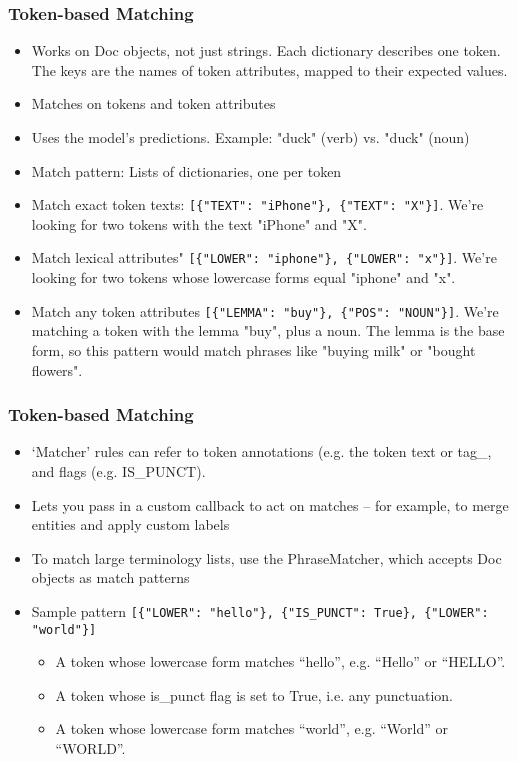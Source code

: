 \begin{frame}[fragile]\frametitle{Token-based Matching }

  \begin{itemize}
	\item Works on Doc objects, not just strings. Each dictionary describes one token. The keys are the names of token attributes, mapped to their expected values.
	\item Matches on tokens and token attributes
	\item Uses the model's predictions. Example: "duck" (verb) vs. "duck" (noun)
	\item Match pattern: Lists of dictionaries, one per token
	\item Match exact token texts: \lstinline|[{"TEXT": "iPhone"}, {"TEXT": "X"}]|. We're looking for two tokens with the text "iPhone" and "X".
	\item Match lexical attributes" \lstinline|[{"LOWER": "iphone"}, {"LOWER": "x"}]|. We're looking for two tokens whose lowercase forms equal "iphone" and "x".
	\item Match any token attributes \lstinline|[{"LEMMA": "buy"}, {"POS": "NOUN"}]|. We're matching a token with the lemma "buy", plus a noun. The lemma is the base form, so this pattern would match phrases like "buying milk" or "bought flowers".

  \end{itemize}
	
\end{frame}

\begin{frame}[fragile]\frametitle{Token-based Matching }

  \begin{itemize}
    \item `Matcher' rules can refer to token annotations (e.g. the token text or tag\_, and flags (e.g. IS\_PUNCT).
		\item Lets you pass in a custom callback to act on matches – for example, to merge entities and apply custom labels
		\item To match large terminology lists, use the PhraseMatcher, which accepts Doc objects as match patterns
		\item Sample pattern \lstinline|[{"LOWER": "hello"}, {"IS_PUNCT": True}, {"LOWER": "world"}]|
  \begin{itemize}
    \item A token whose lowercase form matches “hello”, e.g. “Hello” or “HELLO”.
    \item A token whose is\_punct flag is set to True, i.e. any punctuation.
    \item A token whose lowercase form matches “world”, e.g. “World” or “WORLD”.
  \end{itemize}		
  \end{itemize}
	
\end{frame}

